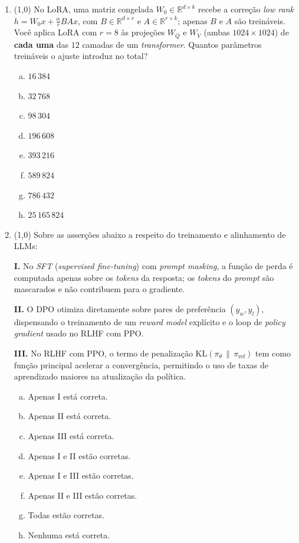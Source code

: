 \documentclass[11pt,a4paper]{article}
\begin{document}
\begin{enumerate}[1)]

\item (1{,}0) No LoRA, uma matriz congelada $W_0 \in \mathbb{R}^{d \times k}$ recebe a correção \textit{low rank} $h = W_0 x + \frac{\alpha}{r} B A x$, com $B \in \mathbb{R}^{d \times r}$ e $A \in \mathbb{R}^{r \times k}$; apenas $B$ e $A$ são treináveis. Você aplica LoRA com $r = 8$ às projeções $W_Q$ e $W_V$ (ambas $1024 \times 1024$) de \textbf{cada uma} das $12$ camadas de um \textit{transformer}. Quantos parâmetros treináveis o ajuste introduz no total?

\begin{enumerate}[a)]
    \item $16\,384$
    \item $32\,768$
    \item $98\,304$
    \item $196\,608$
    \item $393\,216$
    \item $589\,824$
    \item $786\,432$
    \item $25\,165\,824$
\end{enumerate}

\pagebreak
\item (1{,}0) Sobre as asserções abaixo a respeito do treinamento e alinhamento de LLMs:

\textbf{I.} No \textit{SFT} (\textit{supervised fine-tuning}) com \textit{prompt masking}, a função de perda é computada apenas sobre os \textit{tokens} da resposta; os \textit{tokens} do \textit{prompt} são mascarados e não contribuem para o gradiente.

\textbf{II.} O DPO otimiza diretamente sobre pares de preferência $(y_w, y_l)$, dispensando o treinamento de um \textit{reward model} explícito e o loop de \textit{policy gradient} usado no RLHF com PPO.

\textbf{III.} No RLHF com PPO, o termo de penalização $\mathrm{KL}(\pi_\theta \,\|\, \pi_{\text{ref}})$ tem como função principal acelerar a convergência, permitindo o uso de taxas de aprendizado maiores na atualização da política.

\begin{enumerate}[a)]
    \item Apenas I está correta.
    \item Apenas II está correta.
    \item Apenas III está correta.
    \item Apenas I e II estão corretas.
    \item Apenas I e III estão corretas.
    \item Apenas II e III estão corretas.
    \item Todas estão corretas.
    \item Nenhuma está correta.
\end{enumerate}


\end{enumerate}
\end{document}

